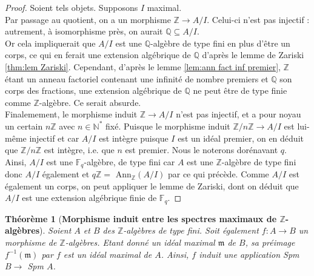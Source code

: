\documentclass[10pt, twoside]{article}
\theoremstyle{plain}
\newtheorem{theorem}{Théorème}[section]
\theoremstyle{definition}
\theoremstyle{plain}
\theoremstyle{plain}
\theoremstyle{definition}
\theoremstyle{remark}
\begin{document}
\begin{proof}
    Soient tels objets. Supposons $I$ maximal.\\
    Par passage au quotient, on a un morphisme $\mathbb{Z} \longrightarrow A/I$. Celui-ci n'est pas injectif : autrement, à isomorphisme près, on aurait $\mathbb{Q} \subseteq A/I$.\\
    Or cela impliquerait que $A/I$ est une $\mathbb{Q}$-algèbre de type fini en plus d'être un corps, ce qui en ferait une extension algébrique de $\mathbb{Q}$ d'après le lemme de Zariski \ref{thm:lem Zariski}. Cependant, d'après le lemme \ref{lem:ann fact inf premier}, $\mathbb{Z}$ étant un anneau factoriel contenant une infinité de nombre premiers et $\mathbb{Q}$ son corps des fractions, une extension algébrique de $\mathbb{Q}$ ne peut être de type finie comme $\mathbb{Z}$-algèbre. Ce serait absurde.\\
    Finalemement, le morphisme induit $\mathbb{Z} \longrightarrow A/I$ n'est pas injectif, et a pour noyau un certain $n\mathbb{Z}$ avec $n \in  \mathbb{N}^*$ fixé. Puisque le morphisme induit $\mathbb{Z}/n \mathbb{Z} \longrightarrow A/I$ est lui-même injectif et car $A/I$ est intègre puisque $I$ est un idéal premier, on en déduit que $\mathbb{Z}/n \mathbb{Z}$ est intègre, i.e. que $n$ est premier. Nous le noterons dorénavant $q$.\\
    Ainsi, $A/I$ est une $\mathbb{F}_q$-algèbre, de type fini car $A$ est une $\mathbb{Z}$-algèbre de type fini donc $A/I$ également et $q\mathbb{Z} =$ Ann$_\mathbb{Z}(A/I)$ par ce qui précède. Comme $A/I$ est également un corps, on peut appliquer le lemme de Zariski, dont on déduit que $A/I$ est une extension algébrique finie de $\mathbb{F}_q$.
\end{proof}

\begin{theorem}[\textbf{Morphisme induit entre les spectres maximaux de $\mathbb{Z}$-algèbres}]\label{thm:morph induit Spm Z-alg}
    Soient $A$ et $B$ des $\mathbb{Z}$-algèbres de type fini. Soit également $f : A \longrightarrow B$ un morphisme de $\mathbb{Z}$-algèbres. Etant donné un idéal maximal $\mathfrak{m}$ de $B$, sa préimage $f^{-1}(\mathfrak{m})$ par $f$ est un idéal maximal de $A$. Ainsi, $f$ induit une application Spm $B \longrightarrow$ Spm $A$.   
\end{theorem}
\end{document}
